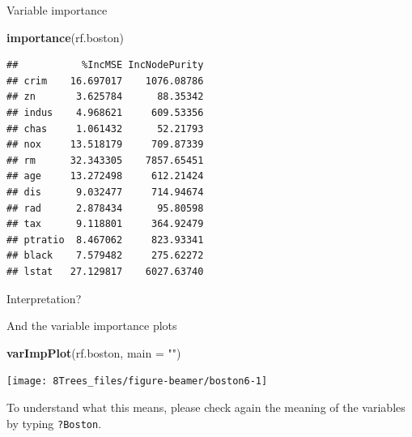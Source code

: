\documentclass[10pt,ignorenonframetext,]{beamer}
\newenvironment{Shaded}{\begin{snugshade}}{\end{snugshade}}
\newcommand{\KeywordTok}[1]{\textcolor[rgb]{0.13,0.29,0.53}{\textbf{#1}}}
\newcommand{\DataTypeTok}[1]{\textcolor[rgb]{0.13,0.29,0.53}{#1}}
\newcommand{\StringTok}[1]{\textcolor[rgb]{0.31,0.60,0.02}{#1}}
\newcommand{\NormalTok}[1]{#1}
\begin{document}
\begin{frame}[fragile]

Variable importance

\scriptsize

\begin{Shaded}
\begin{Highlighting}[]
\KeywordTok{importance}\NormalTok{(rf.boston)}
\end{Highlighting}
\end{Shaded}

\begin{verbatim}
##           %IncMSE IncNodePurity
## crim    16.697017    1076.08786
## zn       3.625784      88.35342
## indus    4.968621     609.53356
## chas     1.061432      52.21793
## nox     13.518179     709.87339
## rm      32.343305    7857.65451
## age     13.272498     612.21424
## dis      9.032477     714.94674
## rad      2.878434      95.80598
## tax      9.118801     364.92479
## ptratio  8.467062     823.93341
## black    7.579482     275.62272
## lstat   27.129817    6027.63740
\end{verbatim}

\normalsize

Interpretation?

\end{frame}

\begin{frame}[fragile]

And the variable importance plots

\scriptsize

\begin{Shaded}
\begin{Highlighting}[]
\KeywordTok{varImpPlot}\NormalTok{(rf.boston, }\DataTypeTok{main =} \StringTok{""}\NormalTok{)}
\end{Highlighting}
\end{Shaded}

\begin{center}\texttt{[image: 8Trees\_files/figure-beamer/boston6-1]} \end{center}

\normalsize
To understand what this means, please check again the meaning of the
variables by typing \texttt{?Boston}.

\end{frame}
\end{document}
